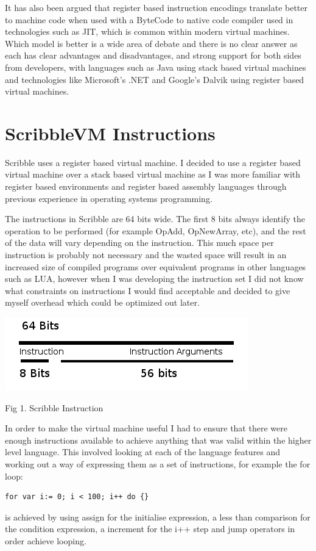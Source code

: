 \documentclass[]{final_report}
\begin{document}
It has also been argued that register based instruction encodings translate better to machine code when used with a ByteCode to native code compiler used in technologies such as JIT, which is common within modern virtual machines. Which model is better is a wide area of debate and there is no clear answer as each has clear advantages and disadvantages, and strong support for both sides from developers, with languages such as Java using stack based virtual machines and technologies like Microsoft's .NET and Google's Dalvik using register based virtual machines.

\section{ScribbleVM Instructions}

Scribble uses a register based virtual machine. I decided to use a register based virtual machine over a stack based virtual machine as I was more familiar with register based environments and register based assembly languages through previous experience in operating systems programming.

The instructions in Scribble are 64 bits wide. The first 8 bits always identify the operation to be performed (for example OpAdd, OpNewArray, etc), and the rest of the data will vary depending on the instruction. This much space per instruction is probably not necessary and the wasted space will result in an increased size of compiled programs over equivalent programs in other languages such as LUA, however when I was developing the instruction set I did not know what constraints on instructions I would find acceptable and decided to give myself overhead which could be optimized out later.

\begin{center}
\includegraphics{"Instruction"}
\end{center}

Fig 1. Scribble Instruction

In order to make the virtual machine useful I had to ensure that there were enough instructions available to achieve anything that was valid within the higher level language. This involved looking at each of the language features and working out a way of expressing them as a set of instructions, for example the for loop:
\begin{verbatim}
for var i:= 0; i < 100; i++ do {}
\end{verbatim}
 is achieved by using assign for the initialise expression, a less than comparison for the condition expression, a increment for the i++ step and jump operators in order achieve looping. 
\end{document}
